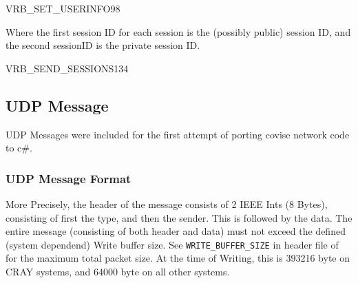 \begin{tcpmessage}{VRB\_SET\_USERINFO}{98}
	\dtypeINT{}
	\dtypeINT{}
	
\end{tcpmessage}

Where the first session ID for each session is the (possibly public) session ID, and the second sessionID is the private session ID. 

\begin{tcpmessage}{VRB\_SEND\_SESSIONS}{134}
	\dtypeINT{}
	
\end{tcpmessage}

\subsection{UDP Message}

UDP Messages were included for the first attempt of porting covise network code to c\#.

\subsubsection{UDP Message Format}

\begin{messagedesc}
\end{messagedesc}

More Precisely, the header of the message consists of 2 IEEE Ints (8 Bytes), consisting of first the type, and then the sender. This is followed by the data. The entire message (consisting of both header and data) must not exceed the defined (system dependend) Write buffer size. See \lstinline|WRITE_BUFFER_SIZE| in header file of  for the maximum total packet size. At the time of Writing, this is 393216 byte on CRAY systems, and 64000 byte on all other systems.

